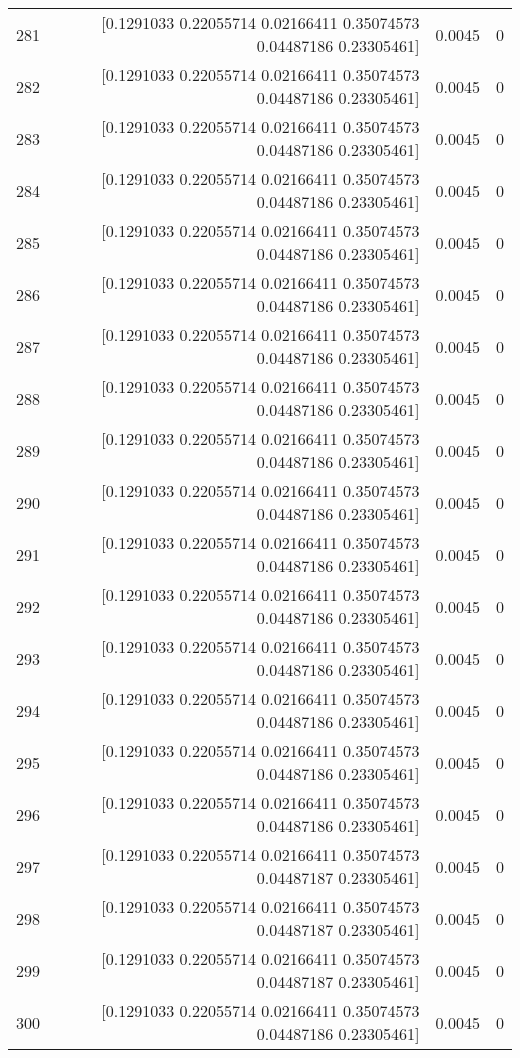 \begin{longtable}{lrrr}
281 & [0.1291033  0.22055714 0.02166411 0.35074573 0.04487186 0.23305461] & 0.0045 & 0 \\
282 & [0.1291033  0.22055714 0.02166411 0.35074573 0.04487186 0.23305461] & 0.0045 & 0 \\
283 & [0.1291033  0.22055714 0.02166411 0.35074573 0.04487186 0.23305461] & 0.0045 & 0 \\
284 & [0.1291033  0.22055714 0.02166411 0.35074573 0.04487186 0.23305461] & 0.0045 & 0 \\
285 & [0.1291033  0.22055714 0.02166411 0.35074573 0.04487186 0.23305461] & 0.0045 & 0 \\
286 & [0.1291033  0.22055714 0.02166411 0.35074573 0.04487186 0.23305461] & 0.0045 & 0 \\
287 & [0.1291033  0.22055714 0.02166411 0.35074573 0.04487186 0.23305461] & 0.0045 & 0 \\
288 & [0.1291033  0.22055714 0.02166411 0.35074573 0.04487186 0.23305461] & 0.0045 & 0 \\
289 & [0.1291033  0.22055714 0.02166411 0.35074573 0.04487186 0.23305461] & 0.0045 & 0 \\
290 & [0.1291033  0.22055714 0.02166411 0.35074573 0.04487186 0.23305461] & 0.0045 & 0 \\
291 & [0.1291033  0.22055714 0.02166411 0.35074573 0.04487186 0.23305461] & 0.0045 & 0 \\
292 & [0.1291033  0.22055714 0.02166411 0.35074573 0.04487186 0.23305461] & 0.0045 & 0 \\
293 & [0.1291033  0.22055714 0.02166411 0.35074573 0.04487186 0.23305461] & 0.0045 & 0 \\
294 & [0.1291033  0.22055714 0.02166411 0.35074573 0.04487186 0.23305461] & 0.0045 & 0 \\
295 & [0.1291033  0.22055714 0.02166411 0.35074573 0.04487186 0.23305461] & 0.0045 & 0 \\
296 & [0.1291033  0.22055714 0.02166411 0.35074573 0.04487186 0.23305461] & 0.0045 & 0 \\
297 & [0.1291033  0.22055714 0.02166411 0.35074573 0.04487187 0.23305461] & 0.0045 & 0 \\
298 & [0.1291033  0.22055714 0.02166411 0.35074573 0.04487187 0.23305461] & 0.0045 & 0 \\
299 & [0.1291033  0.22055714 0.02166411 0.35074573 0.04487187 0.23305461] & 0.0045 & 0 \\
300 & [0.1291033  0.22055714 0.02166411 0.35074573 0.04487186 0.23305461] & 0.0045 & 0 \\

\end{longtable}
